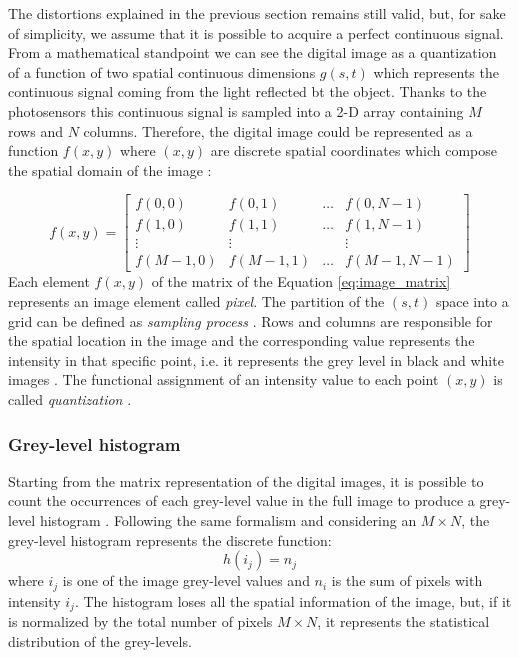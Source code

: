 \documentclass[../main.tex]{subfiles}
\begin{document}
The distortions explained in the previous section remains still valid, but, for sake of simplicity, we assume that it is possible to acquire a perfect continuous signal.
From a mathematical standpoint we can see the digital image as a quantization of a  function of two spatial continuous dimensions $g(s,t)$ which represents the continuous signal coming from the light reflected bt the object.
Thanks to the photosensors this continuous signal is sampled into a 2-D array containing $M$ rows and $N$ columns.
Therefore, the digital image could be represented as a function $f(x,y)$ where $(x,y)$ are discrete spatial coordinates which compose the spatial domain of the image \cite{digital_image_processing_gonzales}:

\begin{equation}\label{eq:image_matrix}
    f(x,y) = \begin{bmatrix} f(0,0) & f(0,1) & \dots & f(0,N-1)\\
                            f(1,0) & f(1,1) & \dots & f(1,N-1)\\
                            \vdots & \vdots &     & \vdots \\
                            f(M-1,0) & f(M-1,1) & \dots & f(M-1,N-1)
             \end{bmatrix}
\end{equation}
Each element $f(x,y)$ of the matrix of the Equation \ref{eq:image_matrix} represents an image element called \textit{pixel}.
The partition of the $(s,t)$ space into a grid can be defined as \textit{sampling process} \cite{digital_image_processing_gonzales}. 
Rows and columns are responsible for the spatial location in the image and the corresponding value represents the intensity in that specific point, i.e. it represents the grey level  in black and white images \cite{annadurai2007fundamentals}. 
The functional assignment of an intensity value to each point $(x,y)$ is called \textit{quantization} \cite{digital_image_processing_gonzales}.


\subsubsection{Grey-level histogram}

Starting from the matrix representation of the digital images, it is possible to count the occurrences of each grey-level value in the full image to produce a grey-level histogram \cite{fiete2010modeling}.  
Following the same formalism and considering an $M\times N$, the grey-level histogram represents the discrete function:
\begin{equation}
    h(i_{j})=n_{j} 
\end{equation}
where $i_{j}$ is one of the image grey-level values and $n_{i}$ is the sum of pixels with intensity $i_{j}$.
The histogram loses all the spatial information of the image, but, if it is normalized by the total number of pixels $M\times N$, it represents the statistical distribution of the grey-levels. 
\end{document}

